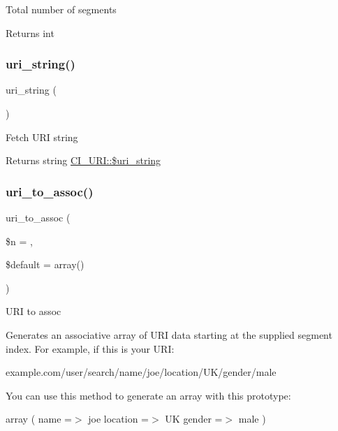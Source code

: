 Total number of segments

\begin{DoxyReturn}{Returns}
int 
\end{DoxyReturn}
\mbox{\label{class_c_i___u_r_i_ac7a3f945c14cc37f89b6d9d1c7a037a4}} 
\subsubsection{\texorpdfstring{uri\+\_\+string()}{uri\_string()}}
{\footnotesize\ttfamily uri\+\_\+string (\begin{DoxyParamCaption}{ }\end{DoxyParamCaption})}

Fetch U\+RI string

\begin{DoxyReturn}{Returns}
string \mbox{\hyperlink{class_c_i___u_r_i_ab908b3e655463a05e8a646c965ca4e53}{C\+I\+\_\+\+U\+R\+I\+::\$uri\+\_\+string}} 
\end{DoxyReturn}
\mbox{\label{class_c_i___u_r_i_a67cca74de71898ee88c167a265cff140}} 
\subsubsection{\texorpdfstring{uri\+\_\+to\+\_\+assoc()}{uri\_to\_assoc()}}
{\footnotesize\ttfamily uri\+\_\+to\+\_\+assoc (\begin{DoxyParamCaption}\item[{}]{\$n = {},  }\item[{}]{\$default = {\ttfamily array()} }\end{DoxyParamCaption})}

U\+RI to assoc

Generates an associative array of U\+RI data starting at the supplied segment index. For example, if this is your U\+RI\+:

example.\+com/user/search/name/joe/location/\+U\+K/gender/male

You can use this method to generate an array with this prototype\+:

array ( name =$>$ joe location =$>$ UK gender =$>$ male )


